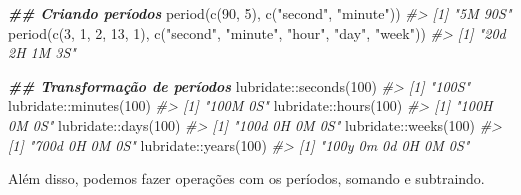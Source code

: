 \documentclass[
]{book}
\newenvironment{Shaded}{\begin{snugshade}}{\end{snugshade}}
\newcommand{\CommentTok}[1]{\textcolor[rgb]{0.37,0.37,0.37}{\textit{#1}}}
\newcommand{\DecValTok}[1]{\textcolor[rgb]{0.06,0.06,0.06}{#1}}
\newcommand{\DocumentationTok}[1]{\textcolor[rgb]{0.37,0.37,0.37}{\textbf{\textit{#1}}}}
\newcommand{\FunctionTok}[1]{\textcolor[rgb]{0,0,0}{#1}}
\newcommand{\NormalTok}[1]{#1}
\newcommand{\SpecialCharTok}[1]{\textcolor[rgb]{0,0,0}{#1}}
\newcommand{\StringTok}[1]{\textcolor[rgb]{0.5,0.5,0.5}{#1}}
\begin{document}
\begin{Shaded}
\begin{Highlighting}[]
\DocumentationTok{\#\# Criando períodos}
\FunctionTok{period}\NormalTok{(}\FunctionTok{c}\NormalTok{(}\DecValTok{90}\NormalTok{, }\DecValTok{5}\NormalTok{), }\FunctionTok{c}\NormalTok{(}\StringTok{"second"}\NormalTok{, }\StringTok{"minute"}\NormalTok{))}
\CommentTok{\#\textgreater{} [1] "5M 90S"}
\FunctionTok{period}\NormalTok{(}\FunctionTok{c}\NormalTok{(}\DecValTok{3}\NormalTok{, }\DecValTok{1}\NormalTok{, }\DecValTok{2}\NormalTok{, }\DecValTok{13}\NormalTok{, }\DecValTok{1}\NormalTok{), }\FunctionTok{c}\NormalTok{(}\StringTok{"second"}\NormalTok{, }\StringTok{"minute"}\NormalTok{, }\StringTok{"hour"}\NormalTok{, }\StringTok{"day"}\NormalTok{, }\StringTok{"week"}\NormalTok{))}
\CommentTok{\#\textgreater{} [1] "20d 2H 1M 3S"}

\DocumentationTok{\#\# Transformação de períodos}
\NormalTok{lubridate}\SpecialCharTok{::}\FunctionTok{seconds}\NormalTok{(}\DecValTok{100}\NormalTok{)}
\CommentTok{\#\textgreater{} [1] "100S"}
\NormalTok{lubridate}\SpecialCharTok{::}\FunctionTok{minutes}\NormalTok{(}\DecValTok{100}\NormalTok{)}
\CommentTok{\#\textgreater{} [1] "100M 0S"}
\NormalTok{lubridate}\SpecialCharTok{::}\FunctionTok{hours}\NormalTok{(}\DecValTok{100}\NormalTok{)}
\CommentTok{\#\textgreater{} [1] "100H 0M 0S"}
\NormalTok{lubridate}\SpecialCharTok{::}\FunctionTok{days}\NormalTok{(}\DecValTok{100}\NormalTok{)}
\CommentTok{\#\textgreater{} [1] "100d 0H 0M 0S"}
\NormalTok{lubridate}\SpecialCharTok{::}\FunctionTok{weeks}\NormalTok{(}\DecValTok{100}\NormalTok{)}
\CommentTok{\#\textgreater{} [1] "700d 0H 0M 0S"}
\NormalTok{lubridate}\SpecialCharTok{::}\FunctionTok{years}\NormalTok{(}\DecValTok{100}\NormalTok{)}
\CommentTok{\#\textgreater{} [1] "100y 0m 0d 0H 0M 0S"}
\end{Highlighting}
\end{Shaded}

Além disso, podemos fazer operações com os períodos, somando e subtraindo.
\end{document}
